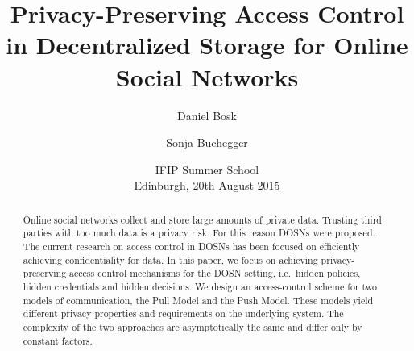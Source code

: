 \title{%
  Privacy-Preserving Access Control
  in Decentralized Storage
  for Online Social Networks
}
\author{%
  Daniel Bosk \and
  Sonja Buchegger
}
\date{IFIP Summer School\\Edinburgh, 20th August 2015}


\mode* %

\begin{abstract}
  Online social networks collect and store large amounts of private data.
  Trusting third parties with too much data is a privacy risk.
  For this reason \acp{DOSN} were proposed.
  The current research on access control in \acp{DOSN} has been focused on 
  efficiently achieving confidentiality for data.
  In this paper, we focus on achieving privacy-preserving access control 
  mechanisms for the \ac{DOSN} setting, i.e.~hidden policies, 
  hidden credentials and hidden decisions.
  We design an access-control scheme for two models of communication, the Pull 
  Model and the Push Model.
  These models yield different privacy properties and requirements on the 
  underlying system.
  The complexity of the two approaches are asymptotically the same and differ 
  only by constant factors.

\end{abstract}



